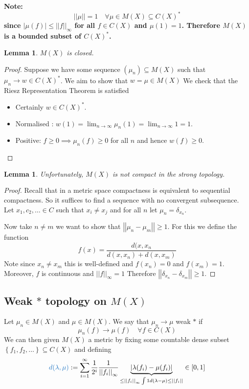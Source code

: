 \documentclass[11pt]{article}
\newcommand{\defeq}{:=}
\newcommand{\abs}[1]{\left|#1\right|}
\newcommand{\norm}[1]{\left|\left|#1\right|\right|}
\newenvironment{defin}
	{\begin{mdframed}[backgroundcolor=white, roundcorner=5pt, linewidth=1pt, linecolor=RoyalBlue]}
	{\end{mdframed}}
\newcommand{\mdf}[1]{{\color{RoyalBlue} #1}}
\newenvironment{note}
	{\begin{mdframed}[backgroundcolor=white, linecolor=RubineRed, roundcorner=5pt, linewidth=1pt]\bfseries{Note:}\normalfont}
	{\end{mdframed}}
\newtheorem{lemma}[prop]{Lemma}
\begin{document}
\begin{note}
	\[
 		\norm{\mu} =1 \quad \forall \mu \in M(X) \subseteq C(X)^\ast
	\]
	since $\abs{\mu(f)}\leq\norm{f}_\infty$ for all $f\in C(X)$ and $\mu(1)=1$.
	Therefore $M(X)$ is a bounded subset of $C(X)^\ast$.
\end{note}

\begin{lemma}
$M(X)$ is closed.
\end{lemma}

\begin{proof}
Suppose we have some sequence $(\mu_n)\subseteq M(X)$ such that $\mu_n\to w\in C(X)^\ast$.
We aim to show that $w=\mu\in M(X)$
We check that the Riesz Representation Theorem is satisfied
\begin{itemize}
	\item Certainly $w\in C(X)^\ast$.
	\item Normalised : $w(1)=\lim_{n\to\infty}\mu_n(1) = \lim_{n\to\infty}1=1$.
	\item Positive: $f\geq 0 \implies \mu_n(f)\geq 0$ for all $n$ and hence $w(f)\geq 0$.
\end{itemize}
\end{proof}

\begin{lemma}
Unfortunately, $M(X)$ is not compact in the strong topology.
\end{lemma}
\begin{proof}
Recall that in a metric space compactness is equivalent to sequential compactness.
So it suffices to find a sequence with no convergent subsequence.
Let $x_1, c_2, \dots \in C$ such that $x_i\neq x_j$ and for all $n$ let $\mu_n=\delta_{x_n}$.

Now take $n\neq m$ we want to show that $\norm{\mu_n - \mu_m} \geq 1$.
For this we define the function 
\[
	f(x)=\frac{d(x, x_n}{d(x, x_n) + d(x, x_m)}
\]
Note since $x_n\neq x_m$ this is well-defined and $f(x_n)=0$ and $f(x_m)=1$.
Moreover, $f$ is continuous and $\norm{f}_\infty = 1$
Therefore $\norm{\delta_{x_n}-\delta_{x_m}}\geq 1$.
\end{proof}

\subsection{Weak $\ast$ topology on $M(X)$}
\begin{defin}
	Let $\mu_n\in M(X)$ and $\mu\in M(X)$.
	We say that $\mu_n\to\mu$ \mdf{weak $\ast$} if
	\[
		\mu_n(f)\to\mu(f) \quad \forall f\in C(X)
	\]
	We can then given $M(X)$ a metric by fixing some countable dense subset $\left\{ f_1, f_2, \dots \right\}\subseteq C(X)$ and defining
	\[
		\mdf{d(\lambda, \mu)}\defeq \sum_{i=1}^{\infty}\frac{1}{2^i}\frac{1}{\norm{f_i}_\infty}\underbrace{\abs{\lambda(f_i)-\mu(f_i)}}_{\leq\norm{f_i}_\infty \int 1 d(\lambda - \mu) \leq \norm{f_i}}\in [0, 1]
	\]
\end{defin}
\end{document}

